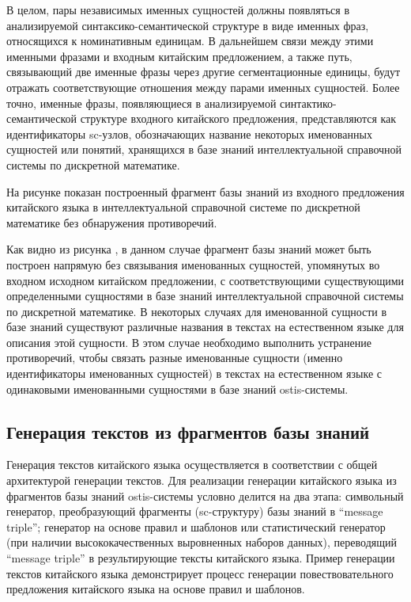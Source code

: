 В целом, пары независимых именных сущностей должны появляться в анализируемой синтаксико-семантической структуре в виде именных фраз, относящихся к номинативным единицам. В дальнейшем связи между этими именными фразами и входным китайским предложением, а также путь, связывающий две именные фразы через другие сегментационные единицы, будут отражать соответствующие отношения между парами именных сущностей. Более точно, именные фразы, появляющиеся в анализируемой синтактико-семантической структуре входного китайского предложения, представляются как идентификаторы sc-узлов, обозначающих название некоторых именованных сущностей или понятий, хранящихся в базе знаний интеллектуальной справочной системы по дискретной математике.

На рисунке \textit{} показан построенный фрагмент базы знаний из входного предложения китайского языка в интеллектуальной справочной системе по дискретной математике без обнаружения противоречий.

Как видно из рисунка \textit{}, в данном случае фрагмент базы знаний может быть построен напрямую без связывания именованных сущностей, упомянутых во входном исходном китайском предложении, с соответствующими существующими определенными сущностями в базе знаний интеллектуальной справочной системы по дискретной математике. В некоторых случаях для именованной сущности в базе знаний существуют различные названия в текстах на естественном языке для описания этой сущности. В этом случае необходимо выполнить устранение противоречий, чтобы связать разные именованные сущности (именно идентификаторы именованных сущностей) в текстах на естественном языке с одинаковыми именованными сущностями в базе знаний ostis-системы. 
\subsection{Генерация текстов из фрагментов базы знаний}
Генерация текстов китайского языка осуществляется в соответствии с общей архитектурой генерации текстов. Для реализации генерации китайского языка из фрагментов базы знаний ostis-системы условно делится на два этапа: символьный генератор, преобразующий фрагменты (sc-структуру) базы знаний в ``message triple''; генератор на основе правил и шаблонов или статистический генератор (при наличии высококачественных выровненных наборов данных), переводящий ``message triple'' в результирующие тексты китайского языка. Пример генерации текстов китайского языка демонстрирует процесс генерации повествовательного предложения китайского языка на основе правил и шаблонов.

